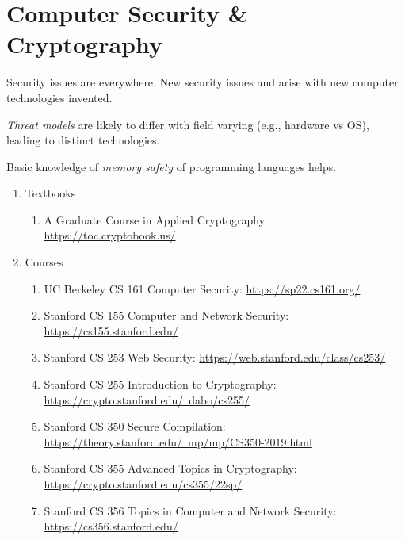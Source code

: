 \documentclass{article}
\begin{document}
\section{Computer Security \& Cryptography}
Security issues are everywhere.
New security issues and arise with new computer technologies invented.

\emph{Threat models} are likely to differ with field varying (e.g., hardware vs OS), leading to distinct technologies.

Basic knowledge of \emph{memory safety} of programming languages helps.

\begin{enumerate}
<<<<<<< HEAD
    \item Textbooks
    \begin{enumerate}
        \item A Graduate Course in
Applied Cryptography\\
        \href{https://toc.cryptobook.us/}{https://toc.cryptobook.us/}
    \end{enumerate}
    \item Courses
    \begin{enumerate}
        \item UC Berkeley CS 161 Computer Security:
        \href{https://sp22.cs161.org/}{https://sp22.cs161.org/}
        \item Stanford CS 155 Computer and Network Security:
        \href{https://cs155.stanford.edu/}{https://cs155.stanford.edu/}
        \item Stanford CS 253 Web Security:
        \href{https://web.stanford.edu/class/cs253/}{https://web.stanford.edu/class/cs253/}
        \item Stanford CS 255 Introduction to Cryptography:
        \href{https://crypto.stanford.edu/~dabo/cs255/}{https://crypto.stanford.edu/~dabo/cs255/}
        \item Stanford CS 350 Secure Compilation:\\
        \href{https://theory.stanford.edu/~mp/mp/CS350-2019.html}{https://theory.stanford.edu/~mp/mp/CS350-2019.html}
        \item Stanford CS 355 Advanced Topics in Cryptography:\\
        \href{https://crypto.stanford.edu/cs355/22sp/}{https://crypto.stanford.edu/cs355/22sp/}
        \item Stanford CS 356 Topics in Computer and Network Security:
        \href{https://cs356.stanford.edu/}{https://cs356.stanford.edu/}    \end{enumerate}


\end{enumerate}
\end{document}

